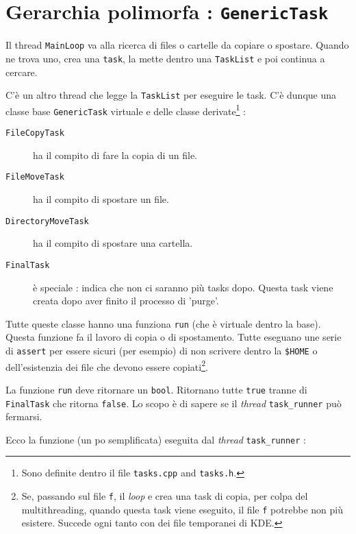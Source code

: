 \documentclass[a4paper,12pt]{article}
\newcommand{\info}[1]{\texttt{#1}}
\begin{document}
\section{Gerarchia polimorfa : \info{GenericTask}}
\label{SECooVDGXooHTFdPE}

Il thread \info{MainLoop} va alla ricerca di files o cartelle da copiare o spostare. Quando ne trova uno, crea una \info{task}, la mette dentro una \info{TaskList} e poi continua a cercare.

C'è un altro thread che legge la \info{TaskList} per eseguire le task. C'è dunque una classe base \info{GenericTask} virtuale e delle classe derivate\footnote{Sono definite dentro il file \info{tasks.cpp} and \info{tasks.h}.} :

\begin{description}
    \item[\info{FileCopyTask}] ha il compito di fare la copia di un file. 
    \item[\info{FileMoveTask}] ha il compito di spostare un file.
    \item[\info{DirectoryMoveTask}] ha il compito di spostare una cartella.
    \item[\info{FinalTask}] è speciale : indica che non ci saranno più tasks dopo. Questa task viene creata dopo aver finito il processo di 'purge'.
\end{description}

Tutte queste classe hanno una funziona \info{run} (che è virtuale dentro la base). Questa funzione fa il lavoro di copia o di spostamento. Tutte eseguano une serie di \info{assert} per essere sicuri (per esempio) di non scrivere dentro la \info{\$HOME} o dell'esistenzia dei file che devono essere copiati\footnote{Se, passando sul file \info{f}, il \emph{loop} e crea una task di copia, per colpa del multithreading, quando questa task viene eseguito, il file \info{f} potrebbe non più esistere. Succede ogni tanto con dei file temporanei di KDE.}.

La funzione \info{run} deve ritornare un \info{bool}. Ritornano tutte \info{true} tranne di \info{FinalTask} che ritorna \info{false}. Lo scopo è di sapere se il \emph{thread} \info{task\_runner} può fermarsi.

Ecco la funzione (un po semplificata) eseguita dal \emph{thread} \info{task\_runner} :


\end{document}
